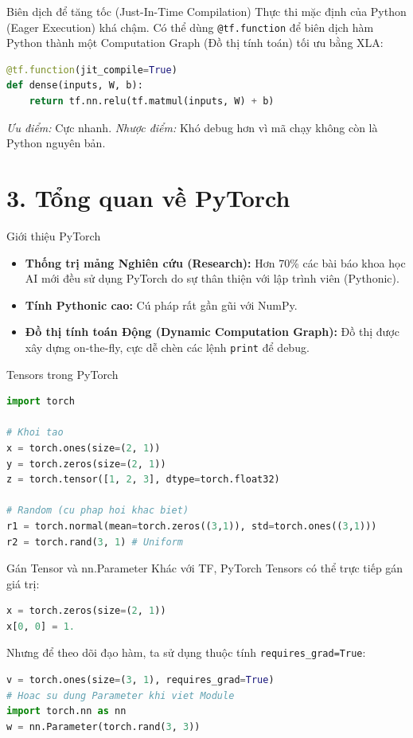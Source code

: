 \documentclass[aspectratio=169]{beamer}
\begin{document}
\begin{frame}[fragile]{Biên dịch để tăng tốc (Just-In-Time Compilation)}
    Thực thi mặc định của Python (Eager Execution) khá chậm. Có thể dùng \texttt{@tf.function} để biên dịch hàm Python thành một Computation Graph (Đồ thị tính toán) tối ưu bằng XLA:
    \begin{lstlisting}[language=Python]
@tf.function(jit_compile=True)
def dense(inputs, W, b):
    return tf.nn.relu(tf.matmul(inputs, W) + b)
    \end{lstlisting}
    \textit{Ưu điểm:} Cực nhanh. \textit{Nhược điểm:} Khó debug hơn vì mã chạy không còn là Python nguyên bản.
\end{frame}

\section{3. Tổng quan về PyTorch}

\begin{frame}{Giới thiệu PyTorch}
    \begin{itemize}
        \item \textbf{Thống trị mảng Nghiên cứu (Research):} Hơn 70\% các bài báo khoa học AI mới đều sử dụng PyTorch do sự thân thiện với lập trình viên (Pythonic).
        \item \textbf{Tính Pythonic cao:} Cú pháp rất gần gũi với NumPy.
        \item \textbf{Đồ thị tính toán Động (Dynamic Computation Graph):} Đồ thị được xây dựng on-the-fly, cực dễ chèn các lệnh \texttt{print} để debug.
    \end{itemize}
\end{frame}

\begin{frame}[fragile]{Tensors trong PyTorch}
    \begin{lstlisting}[language=Python]
import torch

# Khoi tao
x = torch.ones(size=(2, 1))
y = torch.zeros(size=(2, 1))
z = torch.tensor([1, 2, 3], dtype=torch.float32)

# Random (cu phap hoi khac biet)
r1 = torch.normal(mean=torch.zeros((3,1)), std=torch.ones((3,1)))
r2 = torch.rand(3, 1) # Uniform
    \end{lstlisting}
\end{frame}

\begin{frame}[fragile]{Gán Tensor và nn.Parameter}
    Khác với TF, PyTorch Tensors có thể trực tiếp gán giá trị:
    \begin{lstlisting}[language=Python]
x = torch.zeros(size=(2, 1))
x[0, 0] = 1.
    \end{lstlisting}
    Nhưng để theo dõi đạo hàm, ta sử dụng thuộc tính \texttt{requires\_grad=True}:
    \begin{lstlisting}[language=Python]
v = torch.ones(size=(3, 1), requires_grad=True)
# Hoac su dung Parameter khi viet Module
import torch.nn as nn
w = nn.Parameter(torch.rand(3, 3))
    \end{lstlisting}
\end{frame}
\end{document}
